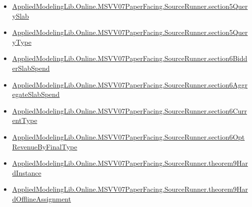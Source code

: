 \documentclass[10pt]{article}
\begin{document}
\begin{itemize}[leftmargin=1.2em]
\begin{itemize}[leftmargin=1.2em]
\item \hyperlink{paper-prerequisite-a90247cabf8cc2bf}{Applied\allowbreak{}Modeling\allowbreak{}Lib.\allowbreak{}Online.\allowbreak{}MSVV07\allowbreak{}Paper\allowbreak{}Facing.\allowbreak{}Source\allowbreak{}Runner.\allowbreak{}section5\allowbreak{}Query\allowbreak{}Slab}
\item \hyperlink{paper-prerequisite-742ee299e85d0647}{Applied\allowbreak{}Modeling\allowbreak{}Lib.\allowbreak{}Online.\allowbreak{}MSVV07\allowbreak{}Paper\allowbreak{}Facing.\allowbreak{}Source\allowbreak{}Runner.\allowbreak{}section5\allowbreak{}Query\allowbreak{}Type}
\item \hyperlink{paper-prerequisite-282ef5d1a0c0f071}{Applied\allowbreak{}Modeling\allowbreak{}Lib.\allowbreak{}Online.\allowbreak{}MSVV07\allowbreak{}Paper\allowbreak{}Facing.\allowbreak{}Source\allowbreak{}Runner.\allowbreak{}section6\allowbreak{}Bidder\allowbreak{}Slab\allowbreak{}Spend}
\item \hyperlink{paper-prerequisite-b6e94f37595e1e04}{Applied\allowbreak{}Modeling\allowbreak{}Lib.\allowbreak{}Online.\allowbreak{}MSVV07\allowbreak{}Paper\allowbreak{}Facing.\allowbreak{}Source\allowbreak{}Runner.\allowbreak{}section6\allowbreak{}Aggregate\allowbreak{}Slab\allowbreak{}Spend}
\item \hyperlink{paper-prerequisite-6b36020b23d610d7}{Applied\allowbreak{}Modeling\allowbreak{}Lib.\allowbreak{}Online.\allowbreak{}MSVV07\allowbreak{}Paper\allowbreak{}Facing.\allowbreak{}Source\allowbreak{}Runner.\allowbreak{}section6\allowbreak{}Current\allowbreak{}Type}
\item \hyperlink{paper-prerequisite-12b6373cc5d91f04}{Applied\allowbreak{}Modeling\allowbreak{}Lib.\allowbreak{}Online.\allowbreak{}MSVV07\allowbreak{}Paper\allowbreak{}Facing.\allowbreak{}Source\allowbreak{}Runner.\allowbreak{}section6\allowbreak{}Opt\allowbreak{}Revenue\allowbreak{}By\allowbreak{}Final\allowbreak{}Type}
\item \hyperlink{paper-prerequisite-4e8b0193699d2745}{Applied\allowbreak{}Modeling\allowbreak{}Lib.\allowbreak{}Online.\allowbreak{}MSVV07\allowbreak{}Paper\allowbreak{}Facing.\allowbreak{}Source\allowbreak{}Runner.\allowbreak{}theorem9\allowbreak{}Hard\allowbreak{}Instance}
\item \hyperlink{paper-prerequisite-90b324d8fe8d736c}{Applied\allowbreak{}Modeling\allowbreak{}Lib.\allowbreak{}Online.\allowbreak{}MSVV07\allowbreak{}Paper\allowbreak{}Facing.\allowbreak{}Source\allowbreak{}Runner.\allowbreak{}theorem9\allowbreak{}Hard\allowbreak{}Offline\allowbreak{}Assignment}

\end{itemize}
\end{itemize}
\end{document}
